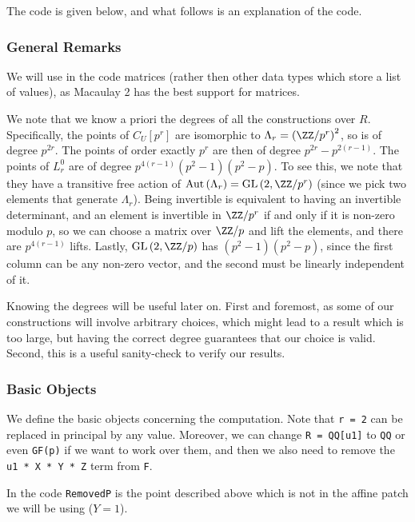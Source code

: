 The code is given below, and what follows is an explanation of the code.

\subsubsection{General Remarks}\label{degree-considerations}

We will use in the code matrices (rather then other data types which store a list of values), as Macaulay 2 has the best support for matrices.

We note that we know a priori the degrees  of all the constructions over $R$.
Specifically, the points of $C_U\left[p^r\right]$ are isomorphic to $\Lambda_r = \left(\ZZ/p^r\right)^2$, so is of degree $p^{2r}$.
The points of order exactly $p^r$ are then of degree $p^{2r}-p^{2\left(r-1\right)}$.
The points of $L_r^0$ are of degree $p^{4\left(r-1\right)}\left(p^2-1\right)\left(p^2-p\right)$.
To see this, we note that they have a transitive free action of $\aut\left(\Lambda_r\right) = \GL\left(2, \ZZ/p^r\right)$ (since we pick two elements that generate $\Lambda_r$).
Being invertible is equivalent to having an invertible determinant, and an element is invertible in $\ZZ/p^r$ if and only if it is non-zero modulo $p$, so we can choose a matrix over $\ZZ/p$ and lift the elements, and there are $p^{4\left(r-1\right)}$ lifts.
Lastly, $\GL\left(2, \ZZ/p\right)$ has $\left(p^2-1\right)\left(p^2-p\right)$, since the first column can be any non-zero vector, and the second must be linearly independent of it.

Knowing the degrees will be useful later on.
First and foremost, as some of our constructions will involve arbitrary choices, which might lead to a result which is too large, but having the correct degree guarantees that our choice is valid.
Second, this is a useful sanity-check to verify our results. 

\subsubsection{Basic Objects}

We define the basic objects concerning the computation.
Note that \texttt{r = 2} can be replaced in principal by any value.	
Moreover, we can change \texttt{R = QQ[u1]} to \texttt{QQ} or even \texttt{GF(p)} if we want to work over them, and then we also need to remove the \texttt{u1 * X * Y * Z} term from \texttt{F}.

In the code \texttt{RemovedP} is the point described above which is not in the affine patch we will be using ($Y = 1$).

